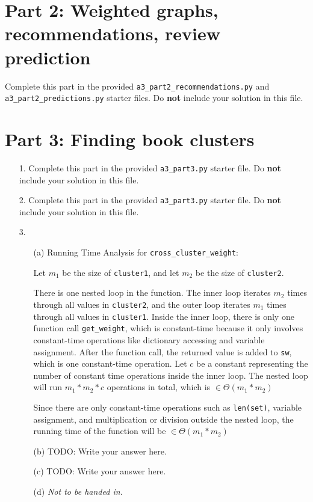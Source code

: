 \documentclass[11pt]{article}
\begin{document}
\section*{Part 2: Weighted graphs, recommendations, review prediction}

Complete this part in the provided \texttt{a3\_part2\_recommendations.py} and \texttt{a3\_part2\_predictions.py} starter files.
Do \textbf{not} include your solution in this file.

\newpage

\section*{Part 3: Finding book clusters}

\begin{enumerate}

\item[1.]
Complete this part in the provided \texttt{a3\_part3.py} starter file.
Do \textbf{not} include your solution in this file.

\item[2.]
Complete this part in the provided \texttt{a3\_part3.py} starter file.
Do \textbf{not} include your solution in this file.

\item[3.]

\begin{enumerate}
\item[(a)]
Running Time Analysis for \texttt{cross\_cluster\_weight}:

Let $m_1$ be the size of \texttt{cluster1}, and let $m_2$ be the size of \texttt{cluster2}.

There is one nested loop in the function. The inner loop iterates $m_2$ times through all values in \texttt{cluster2}, and the outer loop iterates $m_1$ times through all values in \texttt{cluster1}. Inside the inner loop, there is only one function call \texttt{get\_weight}, which is constant-time because it only involves constant-time operations like dictionary accessing and variable assignment. After the function call, the returned value is added to \texttt{sw}, which is one constant-time operation. Let $c$ be a constant representing the number of constant time operations inside the inner loop. The nested loop will run $m_1 * m_2 * c$ operations in total, which is $\in \Theta(m_1 * m_2)$

Since there are only constant-time operations such as \texttt{len(set)}, variable assignment, and multiplication or division outside the nested loop, the running time of the function will be $\in \Theta(m_1 * m_2)$


\item[(b)]
TODO: Write your answer here.

\item[(c)]
TODO: Write your answer here.

\item[(d)]
\emph{Not to be handed in.}
\end{enumerate}

\end{enumerate}
\end{document}
